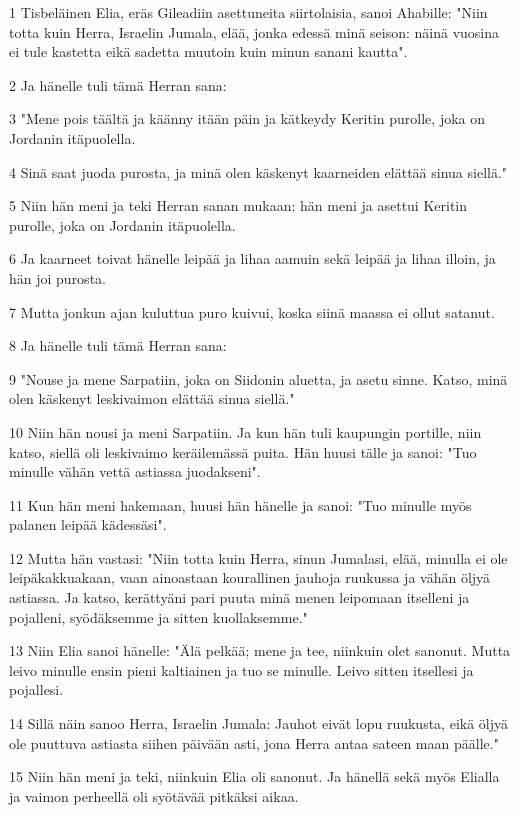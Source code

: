 \par 1 Tisbeläinen Elia, eräs Gileadiin asettuneita siirtolaisia, sanoi Ahabille: "Niin totta kuin Herra, Israelin Jumala, elää, jonka edessä minä seison: näinä vuosina ei tule kastetta eikä sadetta muutoin kuin minun sanani kautta".
\par 2 Ja hänelle tuli tämä Herran sana:
\par 3 "Mene pois täältä ja käänny itään päin ja kätkeydy Keritin purolle, joka on Jordanin itäpuolella.
\par 4 Sinä saat juoda purosta, ja minä olen käskenyt kaarneiden elättää sinua siellä."
\par 5 Niin hän meni ja teki Herran sanan mukaan: hän meni ja asettui Keritin purolle, joka on Jordanin itäpuolella.
\par 6 Ja kaarneet toivat hänelle leipää ja lihaa aamuin sekä leipää ja lihaa illoin, ja hän joi purosta.
\par 7 Mutta jonkun ajan kuluttua puro kuivui, koska siinä maassa ei ollut satanut.
\par 8 Ja hänelle tuli tämä Herran sana:
\par 9 "Nouse ja mene Sarpatiin, joka on Siidonin aluetta, ja asetu sinne. Katso, minä olen käskenyt leskivaimon elättää sinua siellä."
\par 10 Niin hän nousi ja meni Sarpatiin. Ja kun hän tuli kaupungin portille, niin katso, siellä oli leskivaimo keräilemässä puita. Hän huusi tälle ja sanoi: "Tuo minulle vähän vettä astiassa juodakseni".
\par 11 Kun hän meni hakemaan, huusi hän hänelle ja sanoi: "Tuo minulle myös palanen leipää kädessäsi".
\par 12 Mutta hän vastasi: "Niin totta kuin Herra, sinun Jumalasi, elää, minulla ei ole leipäkakkuakaan, vaan ainoastaan kourallinen jauhoja ruukussa ja vähän öljyä astiassa. Ja katso, kerättyäni pari puuta minä menen leipomaan itselleni ja pojalleni, syödäksemme ja sitten kuollaksemme."
\par 13 Niin Elia sanoi hänelle: "Älä pelkää; mene ja tee, niinkuin olet sanonut. Mutta leivo minulle ensin pieni kaltiainen ja tuo se minulle. Leivo sitten itsellesi ja pojallesi.
\par 14 Sillä näin sanoo Herra, Israelin Jumala: Jauhot eivät lopu ruukusta, eikä öljyä ole puuttuva astiasta siihen päivään asti, jona Herra antaa sateen maan päälle."
\par 15 Niin hän meni ja teki, niinkuin Elia oli sanonut. Ja hänellä sekä myös Elialla ja vaimon perheellä oli syötävää pitkäksi aikaa.
